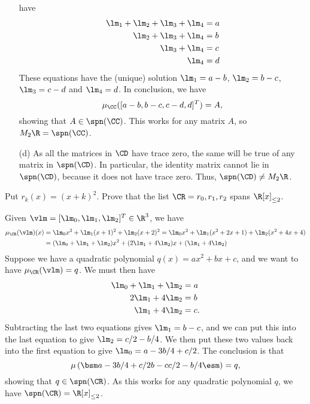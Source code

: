 \begin{solution}
\begin{itemize}
   have
   \begin{align*}
    \lm_1 + \lm_2 + \lm_3 + \lm_4 &= a \\
            \lm_2 + \lm_3 + \lm_4 &= b \\
                    \lm_3 + \lm_4 &= c \\
                            \lm_4 &= d
   \end{align*}
   These equations have the (unique) solution $\lm_1=a-b$,
   $\lm_2=b-c$, $\lm_3=c-d$ and $\lm_4=d$.  In conclusion,
   we have
   \[ \mu_{\CC}([a-b, b-c, c-d, d]^T) = A,  \]
   showing that $A\in\spn(\CC)$.  This works for any matrix
   $A$, so $M_2\R=\spn(\CC)$.
  \item[(d)] As all the matrices in $\CD$ have trace zero,
   the same will be true of any matrix in $\spn(\CD)$.  In
   particular, the identity matrix cannot lie in
   $\spn(\CD)$, because it does not have trace zero.  Thus,
   $\spn(\CD)\neq M_2\R$.
 \end{itemize}
\end{solution}

\begin{exercise}\label{ex-prove-rk-spans}
 Put $r_k(x)=(x+k)^2$.  Prove that the list
 $\CR=r_0,r_1,r_2$ spans $\R[x]_{\leq 2}$.
\end{exercise}
\begin{solution}
 Given $\vlm=[\lm_0,\lm_1,\lm_2]^T\in\R^3$, we have 
 \begin{align*}
  \mu_\CR(\vlm)(x)
   &= \lm_0x^2 + \lm_1(x+1)^2 + \lm_2(x+2)^2 
    = \lm_0x^2 + \lm_1(x^2+2x+1) + \lm_2(x^2+4x+4) \\
   &= (\lm_0+\lm_1+\lm_2)x^2 + (2\lm_1+4\lm_2)x + (\lm_1+4\lm_2)
 \end{align*}
 Suppose we have a quadratic polynomial $q(x)=ax^2+bx+c$,
 and we want to have $\mu_\CR(\vlm)=q$.  We must then have
 \begin{align*}
  \lm_0+\lm_1+\lm_2 &= a \\
  2\lm_1 + 4\lm_2 &= b \\
  \lm_1 + 4\lm_2 &= c.
 \end{align*}
 Subtracting the last two equations gives $\lm_1=b-c$, and
 we can put this into the last equation to give
 $\lm_2=c/2-b/4$.  We then put these two values back into
 the first equation to give $\lm_0=a-3b/4+c/2$.  The
 conclusion is that
 \[ \mu\left(\bsm a-3b/4+c/2 \\ b-c \\ c/2-b/4\esm\right) = q,
 \]
 showing that $q\in\spn(\CR)$.  As this works for any
 quadratic polynomial $q$, we have $\spn(\CR)=\R[x]_{\leq 2}$.
\end{solution}

